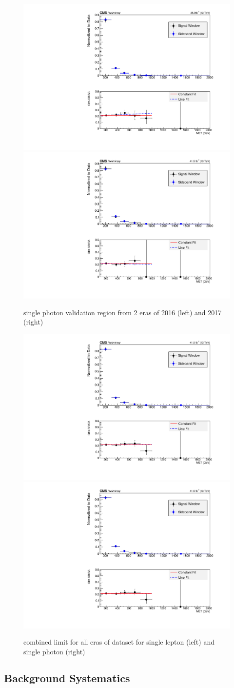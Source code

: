 \begin{figure}[htbp!]
  \begin{center}
    \includegraphics[trim={5px 5px 5px 5px},clip,width=0.48\linewidth]{plots/bkgestimation/Data2016SinglePhoton.pdf}\\
    \includegraphics[trim={5px 5px 5px 5px},clip,width=0.48\linewidth]{plots/bkgestimation/Data2017SinglePhoton.pdf}
    \caption{single photon validation region from 2 eras of 2016 (left) and 2017 (right)}
    \label{fig:DataSinglePhoton}
  \end{center}
\end{figure} 

\begin{figure}[htbp!]
  \begin{center}
    \includegraphics[trim={5px 5px 5px 5px},clip,width=0.48\linewidth]{plots/bkgestimation/DatacombinedSinglePhoton.pdf}\\
    \includegraphics[trim={5px 5px 5px 5px},clip,width=0.48\linewidth]{plots/bkgestimation/DatacombinedSinglePhoton.pdf}
    \caption{combined limit for all eras of dataset for single lepton (left) and single photon (right)}
    \label{fig:DataCombinedSingleLepton}
  \end{center}
\end{figure}

\subsection{Background Systematics}
\label{sec:bkgSystematics}
 
